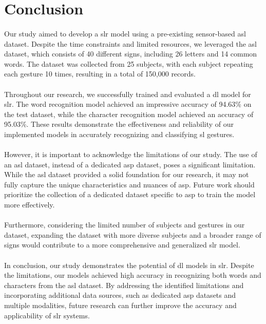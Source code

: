 \section{Conclusion}
\paragraph{}
Our study aimed to develop a \ac{slr} model using a pre-existing sensor-based \ac{asl} dataset. Despite the time constraints and limited resources, we leveraged the \ac{asl} dataset, which consists of 40 different signs, including 26 letters and 14 common words. The dataset was collected from 25 subjects, with each subject repeating each gesture 10 times, resulting in a total of 150,000 records.
\paragraph{}
Throughout our research, we successfully trained and evaluated a \ac{dl} model for \ac{slr}. The word recognition model achieved an impressive accuracy of 94.63\% on the test dataset, while the character recognition model achieved an accuracy of 95.03\%. These results demonstrate the effectiveness and reliability of our implemented models in accurately recognizing and classifying \ac{sl} gestures.
\paragraph{}
However, it is important to acknowledge the limitations of our study. The use of an \ac{asl} dataset, instead of a dedicated \ac{asp} dataset, poses a significant limitation. While the \ac{asl} dataset provided a solid foundation for our research, it may not fully capture the unique characteristics and nuances of \ac{asp}. Future work should prioritize the collection of a dedicated dataset specific to \ac{asp} to train the model more effectively.
\paragraph{}
Furthermore, considering the limited number of subjects and gestures in our dataset, expanding the dataset with more diverse subjects and a broader range of signs would contribute to a more comprehensive and generalized \ac{slr} model.
\paragraph{}
In conclusion, our study demonstrates the potential of \ac{dl} models in \ac{slr}. Despite the limitations, our models achieved high accuracy in recognizing both words and characters from the \ac{asl} dataset. By addressing the identified limitations and incorporating additional data sources, such as dedicated \ac{asp} datasets and multiple modalities, future research can further improve the accuracy and applicability of \ac{slr} systems.
